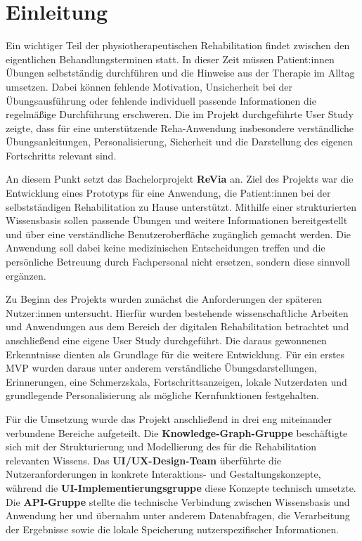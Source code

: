 \section{Einleitung}

Ein wichtiger Teil der physiotherapeutischen Rehabilitation findet zwischen den eigentlichen Behandlungsterminen statt. In dieser Zeit müssen Patient:innen Übungen selbstständig durchführen und die Hinweise aus der Therapie im Alltag umsetzen. Dabei können fehlende Motivation, Unsicherheit bei der Übungsausführung oder fehlende individuell passende Informationen die regelmäßige Durchführung erschweren. Die im Projekt durchgeführte User Study zeigte, dass für eine unterstützende Reha-Anwendung insbesondere verständliche Übungsanleitungen, Personalisierung, Sicherheit und die Darstellung des eigenen Fortschritts relevant sind.

An diesem Punkt setzt das Bachelorprojekt \textbf{ReVia} an. Ziel des Projekts war die Entwicklung eines Prototyps für eine Anwendung, die Patient:innen bei der selbstständigen Rehabilitation zu Hause unterstützt. Mithilfe einer strukturierten Wissensbasis sollen passende Übungen und weitere Informationen bereitgestellt und über eine verständliche Benutzeroberfläche zugänglich gemacht werden. Die Anwendung soll dabei keine medizinischen Entscheidungen treffen und die persönliche Betreuung durch Fachpersonal nicht ersetzen, sondern diese sinnvoll ergänzen.

Zu Beginn des Projekts wurden zunächst die Anforderungen der späteren Nutzer:innen untersucht. Hierfür wurden bestehende wissenschaftliche Arbeiten und Anwendungen aus dem Bereich der digitalen Rehabilitation betrachtet und anschließend eine eigene User Study durchgeführt. Die daraus gewonnenen Erkenntnisse dienten als Grundlage für die weitere Entwicklung. Für ein erstes MVP wurden daraus unter anderem verständliche Übungsdarstellungen, Erinnerungen, eine Schmerzskala, Fortschrittsanzeigen, lokale Nutzerdaten und grundlegende Personalisierung als mögliche Kernfunktionen festgehalten.

Für die Umsetzung wurde das Projekt anschließend in drei eng miteinander verbundene Bereiche aufgeteilt. Die \textbf{Knowledge-Graph-Gruppe} beschäftigte sich mit der Strukturierung und Modellierung des für die Rehabilitation relevanten Wissens. Das \textbf{UI/UX-Design-Team} überführte die Nutzeranforderungen in konkrete Interaktions- und Gestaltungskonzepte, während die \textbf{UI-Implementierungsgruppe} diese Konzepte technisch umsetzte. Die \textbf{API-Gruppe} stellte die technische Verbindung zwischen Wissensbasis und Anwendung her und übernahm unter anderem Datenabfragen, die Verarbeitung der Ergebnisse sowie die lokale Speicherung nutzerspezifischer Informationen.

